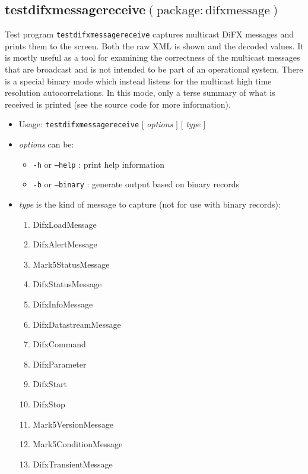 
\subsection{testdifxmessagereceive{\small $\mathrm{(package: difxmessage)}$}} \label{sec:testdifxmessagereceive}

Test program {\tt testdifxmessagereceive} captures multicast DiFX messages and prints them to the screen.
Both the raw XML is shown and the decoded values.
It is mostly useful as a tool for examining the correctness of the multicast messages that are broadcast and is not intended to be part of an operational system.
There is a special binary mode which instead listens for the multicast high time resolution autocorrelations.
In this mode, only a terse summary of what is received is printed (see the source code for more information).

\begin{itemize}
\item[] Usage: {\tt testdifxmessagereceive}  $[$ {\em options} $]$  $[$ {\em type} $]$
\item[] {\em options} can be:
\begin{itemize}
\item[] {\tt -h} or {\tt --help} : print help information
\item[] {\tt -b} or {\tt --binary} : generate output based on binary records
\end{itemize}
\item[] {\em type} is the kind of message to capture (not for use with binary records):
\begin{enumerate}
\item DifxLoadMessage
\item DifxAlertMessage
\item Mark5StatusMessage
\item DifxStatusMessage
\item DifxInfoMessage
\item DifxDatastreamMessage
\item DifxCommand
\item DifxParameter
\item DifxStart
\item DifxStop
\item Mark5VersionMessage
\item Mark5ConditionMessage
\item DifxTransientMessage
\end{enumerate}
\end{itemize}

